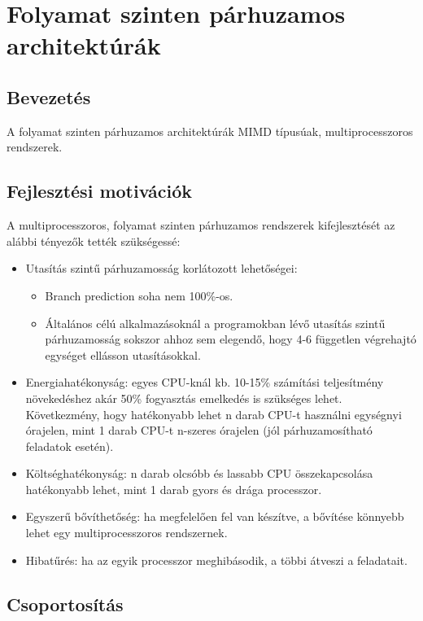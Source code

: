 
\chapter{Folyamat szinten párhuzamos architektúrák}

\section{Bevezetés}
A folyamat szinten párhuzamos architektúrák MIMD típusúak, multiprocesszoros rendszerek.

\section{Fejlesztési motivációk}
A multiprocesszoros, folyamat szinten párhuzamos rendszerek kifejlesztését az alábbi tényezők tették szükségessé:
\begin{itemize}
    \item Utasítás szintű párhuzamosság korlátozott lehetőségei:
    \begin{itemize}
        \item Branch prediction soha nem 100\%-os.
        \item Általános célú alkalmazásoknál a programokban lévő utasítás szintű párhuzamosság sokszor ahhoz sem elegendő, hogy 4-6 független végrehajtó egységet ellásson utasításokkal.
    \end{itemize}
    \item Energiahatékonyság: egyes CPU-knál kb. 10-15\% számítási teljesítmény növekedéshez akár 50\% fogyasztás emelkedés is szükséges lehet. Következmény, hogy hatékonyabb lehet n darab CPU-t használni egységnyi órajelen, mint 1 darab CPU-t n-szeres órajelen (jól párhuzamosítható feladatok esetén).
    \item Költséghatékonyság: n darab olcsóbb és lassabb CPU összekapcsolása hatékonyabb lehet, mint 1 darab gyors és drága processzor.
    \item Egyszerű bővíthetőség: ha megfelelően fel van készítve, a bővítése könnyebb lehet egy multiprocesszoros rendszernek.
    \item Hibatűrés: ha az egyik processzor meghibásodik, a többi átveszi a feladatait.
\end{itemize}

\section{Csoportosítás}
